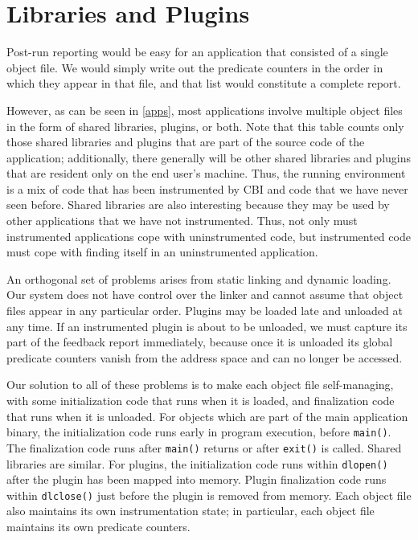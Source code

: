 \documentclass[10pt,twocolumn]{article}
\begin{document}
\section{Libraries and Plugins}

Post-run reporting would be easy for an application that consisted of
a single object file.  We would simply write out the predicate
counters in the order in which they appear in that file, and that list
would constitute a complete report.

However, as can be seen in \autoref{apps}, most applications involve
multiple object files in the form of shared libraries, plugins, or
both.  Note that this table counts only those shared libraries and
plugins that are part of the source code of the application;
additionally, there generally will be other shared
libraries and plugins that are resident only on the end user's
machine.  Thus, the running environment is a mix of code that has
been instrumented by CBI and code that we have never seen before.
Shared libraries are also interesting because they may be used by
other applications that we have not instrumented.  Thus, not only must
instrumented applications cope with uninstrumented code, but
instrumented code must cope with finding itself in an
uninstrumented application.

An orthogonal set of problems arises from static linking and dynamic
loading.  Our system does not have control over the linker and
cannot assume that object files appear in any particular order.
Plugins may be loaded late and unloaded at any time.  If an
instrumented plugin is about to be unloaded, we must capture its part
of the feedback report immediately, because once it is unloaded its
global predicate counters vanish from the address space and can no
longer be accessed.

Our solution to all of these problems is to make each object file
self-managing, with some initialization code that runs when it is
loaded, and finalization code that runs when it is unloaded.  For
objects which are part of the main application binary, the
initialization code runs early in program execution, before
\texttt{main()}.  The finalization code runs after \texttt{main()}
returns or after \texttt{exit()} is called.  Shared libraries are
similar.  For plugins, the initialization code runs within
\texttt{dlopen()} after the plugin has been mapped into memory.
Plugin finalization code runs within \texttt{dlclose()} just before
the plugin is removed from memory.  Each object file also maintains
its own instrumentation state; in particular, each object file maintains
its own predicate counters.
\end{document}
